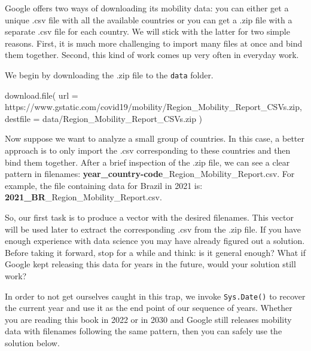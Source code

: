 \documentclass[
]{book}
\newenvironment{Shaded}{\begin{snugshade}}{\end{snugshade}}
\newcommand{\AttributeTok}[1]{\textcolor[rgb]{0.77,0.63,0.00}{#1}}
\newcommand{\FunctionTok}[1]{\textcolor[rgb]{0.00,0.00,0.00}{#1}}
\newcommand{\NormalTok}[1]{#1}
\newcommand{\StringTok}[1]{\textcolor[rgb]{0.31,0.60,0.02}{#1}}
\begin{document}
Google offers two ways of downloading its mobility data: you can either get a unique .csv file with all the available countries or you can get a .zip file with a separate .csv file for each country. We will stick with the latter for two simple reasons. First, it is much more challenging to import many files at once and bind them together. Second, this kind of work comes up very often in everyday work.

We begin by downloading the .zip file to the \texttt{data} folder.

\begin{Shaded}
\begin{Highlighting}[]
\FunctionTok{download.file}\NormalTok{(}
  \AttributeTok{url  =} \StringTok{\textquotesingle{}https://www.gstatic.com/covid19/mobility/Region\_Mobility\_Report\_CSVs.zip\textquotesingle{}}\NormalTok{,}
  \AttributeTok{destfile =} \StringTok{\textquotesingle{}data/Region\_Mobility\_Report\_CSVs.zip\textquotesingle{}}
\NormalTok{  )}
\end{Highlighting}
\end{Shaded}

Now suppose we want to analyze a small group of countries. In this case, a better approach is to only import the .csv corresponding to these countries and then bind them together. After a brief inspection of the .zip file, we can see a clear pattern in filenames: \textbf{year\_country-code}\_Region\_Mobility\_Report.csv. For example, the file containing data for Brazil in 2021 is: \textbf{2021\_BR}\_Region\_Mobility\_Report.csv.

So, our first task is to produce a vector with the desired filenames. This vector will be used later to extract the corresponding .csv from the .zip file. If you have enough experience with data science you may have already figured out a solution. Before taking it forward, stop for a while and think: is it general enough? What if Google kept releasing this data for years in the future, would your solution still work?

In order to not get ourselves caught in this trap, we invoke \texttt{Sys.Date()} to recover the current year and use it as the end point of our sequence of years. Whether you are reading this book in 2022 or in 2030 and Google still releases mobility data with filenames following the same pattern, then you can safely use the solution below.
\end{document}
